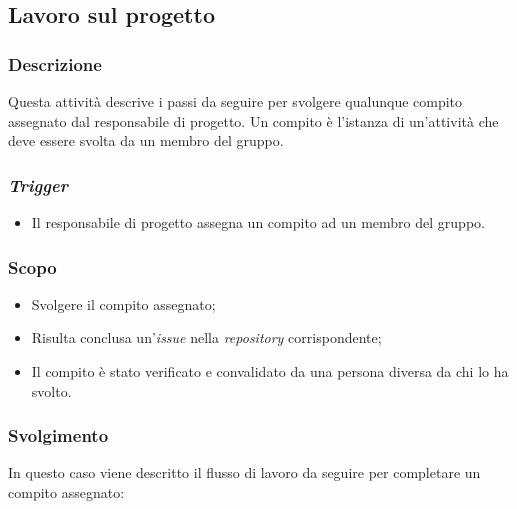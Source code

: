 \subsection{Lavoro sul progetto}
\label{lavoro-sul-progetto}

\subsubsection{Descrizione}
Questa attività descrive i passi da seguire per svolgere qualunque compito
assegnato dal responsabile di progetto. Un compito è l'istanza di un'attività
che deve essere svolta da un membro del gruppo.


\subsubsection{\textit{Trigger}}
\begin{itemize}
	\item Il responsabile di progetto assegna un compito ad un membro del
	      gruppo.
\end{itemize}

\subsubsection{Scopo}
\begin{itemize}
	\item Svolgere il compito assegnato;
	\item Risulta conclusa un'\textit{issue} nella \textit{repository}
	      corrispondente;
	\item Il compito è stato verificato e convalidato da una persona diversa
	      da chi lo ha svolto.
\end{itemize}

\subsubsection{Svolgimento}
In questo caso viene descritto il flusso di lavoro da seguire per completare
un compito assegnato:

